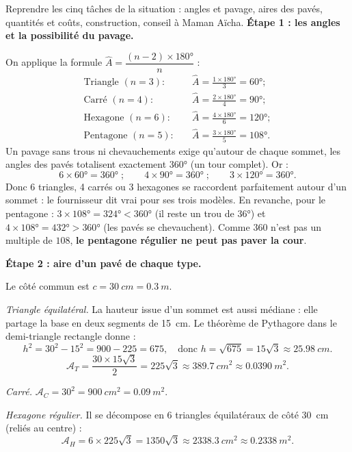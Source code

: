 \documentclass[11pt]{article}
\begin{document}
\begin{exoresolu}
Reprendre les cinq tâches de la situation : angles et pavage, aires des pavés, quantités et coûts, construction, conseil à Maman Aïcha.
\tcblower
\textbf{Étape 1 : les angles et la possibilité du pavage.}

On applique la formule $\widehat{A} = \dfrac{(n-2)\times 180°}{n}$ :
\begin{align*}
\text{Triangle }(n=3) :&\quad \widehat{A} = \frac{1\times 180°}{3} = 60° ;\\
\text{Carré }(n=4) :&\quad \widehat{A} = \frac{2\times 180°}{4} = 90° ;\\
\text{Hexagone }(n=6) :&\quad \widehat{A} = \frac{4\times 180°}{6} = 120° ;\\
\text{Pentagone }(n=5) :&\quad \widehat{A} = \frac{3\times 180°}{5} = 108°.
\end{align*}
Un pavage sans trous ni chevauchements exige qu'autour de chaque sommet, les angles des pavés totalisent exactement $360°$ (un tour complet). Or :
\[ 6\times 60° = 360° \;;\qquad 4\times 90° = 360° \;;\qquad 3\times 120° = 360°. \]
Donc 6 triangles, 4 carrés ou 3 hexagones se raccordent parfaitement autour d'un sommet : le fournisseur dit vrai pour ses trois modèles. En revanche, pour le pentagone : $3\times 108° = 324° < 360°$ (il reste un trou de $36°$) et $4\times 108° = 432° > 360°$ (les pavés se chevauchent). Comme $360$ n'est pas un multiple de $108$, \textbf{le pentagone régulier ne peut pas paver la cour}.

\textbf{Étape 2 : aire d'un pavé de chaque type.}

Le côté commun est $c = \SI{30}{cm} = \SI{0,3}{m}$.

\emph{Triangle équilatéral.} La hauteur issue d'un sommet est aussi médiane : elle partage la base en deux segments de \SI{15}{cm}. Le théorème de Pythagore dans le demi-triangle rectangle donne :
\[ h^2 = 30^2 - 15^2 = 900 - 225 = 675, \quad \text{donc } h = \sqrt{675} = 15\sqrt{3} \approx \SI{25,98}{cm}. \]
\[ \mathcal{A}_T = \frac{30 \times 15\sqrt{3}}{2} = 225\sqrt{3} \approx \SI{389,7}{cm^2} \approx \SI{0,0390}{m^2}. \]

\emph{Carré.} $\mathcal{A}_C = 30^2 = \SI{900}{cm^2} = \SI{0,09}{m^2}$.

\emph{Hexagone régulier.} Il se décompose en 6 triangles équilatéraux de côté \SI{30}{cm} (reliés au centre) :
\[ \mathcal{A}_H = 6 \times 225\sqrt{3} = 1350\sqrt{3} \approx \SI{2338,3}{cm^2} \approx \SI{0,2338}{m^2}. \]


\end{exoresolu}
\end{document}
